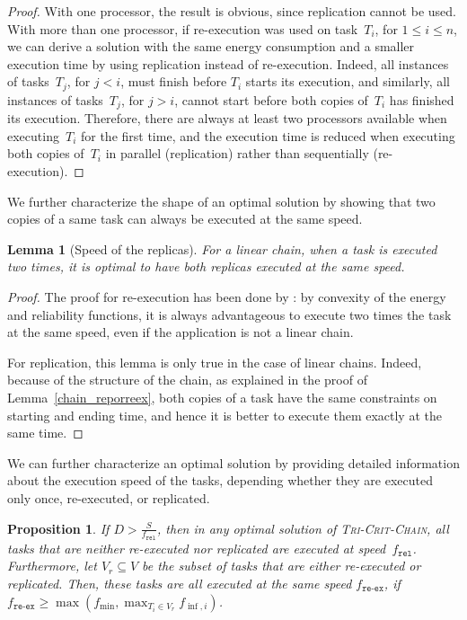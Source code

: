 \documentclass[a4paper]{article}
\theoremstyle{plain}
\newtheorem{lemma}{Lemma}
\newtheorem{proposition}{Proposition}
\theoremstyle{definition}
\theoremstyle{remark}
\newcommand{\fmin}{\ensuremath{f_{\min}}\xspace}
\newcommand{\finf}{\ensuremath{f_{\inf,i}}\xspace}
\newcommand{\fr}{\ensuremath{f_{\texttt{rel}}}\xspace}
\newcommand{\freex}{\ensuremath{f_{\texttt{re-ex}}}\xspace}
\newcommand{\chain}{\textsc{Tri-Crit-Chain}\xspace}
\begin{document}
\begin{proof}
  With one processor, the result is obvious, since replication cannot
  be used. With more than one processor, if re-execution was used on
  task~$T_i$, for $1\leq i \leq n$, we can derive a solution with the
  same energy consumption and a smaller execution time by using
  replication instead of re-execution. Indeed, all instances of
  tasks~$T_j$, for $j<i$, must finish before $T_i$ starts its
  execution, and similarly, all instances of tasks~$T_j$, for $j>i$,
  cannot start before both copies of~$T_i$ has finished its
  execution. Therefore, there are always at least two processors
  available when executing~$T_i$ for the first time, and the execution
  time is reduced when executing both copies of~$T_i$ in parallel
  (replication) rather than sequentially (re-execution). 
\end{proof}


We further characterize the shape of an optimal solution by showing
that two copies of a same task can always be executed at the same
speed. 
\begin{lemma}[Speed of the replicas]
  \label{lemma.speed.chain}
  For a linear chain, when a task is executed two times, it is optimal
  to have both replicas executed at the same speed.
\end{lemma}

\begin{proof}
  The proof for re-execution has been done by \cite{rr7757}: by
  convexity of the energy and reliability functions, it is always
  advantageous to execute two times the task at the same speed, even
  if the application is not a linear chain. 

  For replication, this lemma is only true in the case of linear
  chains. Indeed, because of the structure of the chain, as explained
  in the proof of Lemma~\ref{chain_reporreex}, both copies of a task
  have the same constraints on starting and ending time, and hence it
  is better to execute them exactly at the same time. 
\end{proof}



We can further characterize an optimal solution by providing detailed
information about the execution speed of the tasks, depending whether
they are executed only once, re-executed, or replicated. 
\begin{proposition}
  \label{prop_WC_fr}
  If $D > \frac{S}{\fr}$, then in any optimal solution of
  \chain, all tasks that are neither
  re-executed nor replicated are executed at speed~\fr.  Furthermore, 
  let $V_r \subseteq V$ be the subset of tasks that are either
  re-executed or replicated. Then, these tasks are all executed at the
  same speed \freex, if $\freex \geq \max(\fmin, \max_{T_i \in V_r}
  \finf)$. 
\end{proposition}
\end{document}

